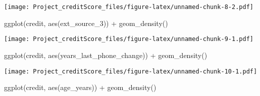 \documentclass[
]{article}
\newenvironment{Shaded}{\begin{snugshade}}{\end{snugshade}}
\newcommand{\AttributeTok}[1]{\textcolor[rgb]{0.77,0.63,0.00}{#1}}
\newcommand{\DecValTok}[1]{\textcolor[rgb]{0.00,0.00,0.81}{#1}}
\newcommand{\FunctionTok}[1]{\textcolor[rgb]{0.00,0.00,0.00}{#1}}
\newcommand{\NormalTok}[1]{#1}
\newcommand{\OtherTok}[1]{\textcolor[rgb]{0.56,0.35,0.01}{#1}}
\newcommand{\SpecialCharTok}[1]{\textcolor[rgb]{0.00,0.00,0.00}{#1}}
\begin{document}
\begin{Shaded}
\end{Shaded}

\texttt{[image: Project\_creditScore\_files/figure-latex/unnamed-chunk-8-2.pdf]}

\begin{Shaded}
\begin{Highlighting}[]
\FunctionTok{ggplot}\NormalTok{(credit, }\FunctionTok{aes}\NormalTok{(ext\_source\_3)) }\SpecialCharTok{+}
  \FunctionTok{geom\_density}\NormalTok{()}
\end{Highlighting}
\end{Shaded}

\texttt{[image: Project\_creditScore\_files/figure-latex/unnamed-chunk-9-1.pdf]}

\begin{Shaded}
\begin{Highlighting}[]
\FunctionTok{ggplot}\NormalTok{(credit, }\FunctionTok{aes}\NormalTok{(years\_last\_phone\_change)) }\SpecialCharTok{+}
  \FunctionTok{geom\_density}\NormalTok{()}
\end{Highlighting}
\end{Shaded}

\texttt{[image: Project\_creditScore\_files/figure-latex/unnamed-chunk-10-1.pdf]}

\begin{Shaded}
\begin{Highlighting}[]
\FunctionTok{ggplot}\NormalTok{(credit, }\FunctionTok{aes}\NormalTok{(age\_years)) }\SpecialCharTok{+}
  \FunctionTok{geom\_density}\NormalTok{()}
\end{Highlighting}
\end{Shaded}
\end{document}
